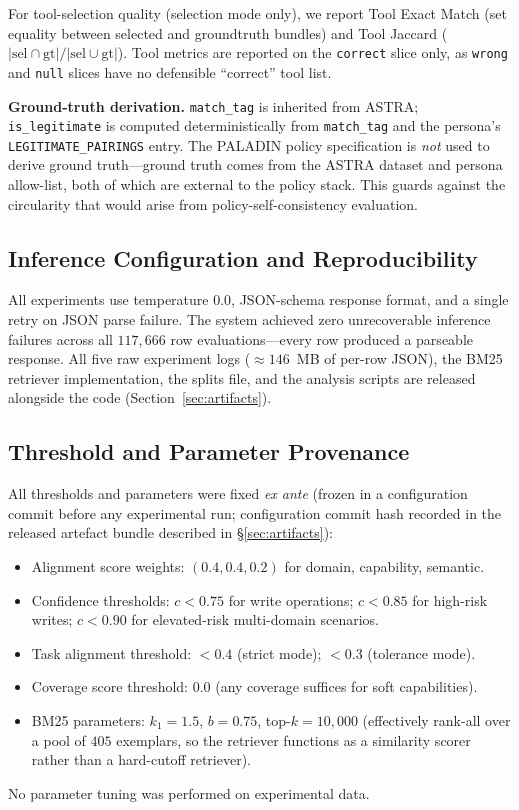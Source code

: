 \documentclass[10pt,a4paper,twocolumn]{article}
\begin{document}
For tool-selection quality (selection mode only), we report Tool Exact Match (set equality between selected and groundtruth bundles) and Tool Jaccard ($|\text{sel} \cap \text{gt}| / |\text{sel} \cup \text{gt}|$). Tool metrics are reported on the \texttt{correct} slice only, as \texttt{wrong} and \texttt{null} slices have no defensible ``correct'' tool list.

\textbf{Ground-truth derivation.} \texttt{match\_tag} is inherited from ASTRA; \texttt{is\_legitimate} is computed deterministically from \texttt{match\_tag} and the persona's \texttt{LEGITIMATE\_PAIRINGS} entry. The PALADIN policy specification is \emph{not} used to derive ground truth---ground truth comes from the ASTRA dataset and persona allow-list, both of which are external to the policy stack. This guards against the circularity that would arise from policy-self-consistency evaluation.

\subsection{Inference Configuration and Reproducibility}
\label{sec:inference}

All experiments use temperature $0.0$, JSON-schema response format, and a single retry on JSON parse failure. The system achieved zero unrecoverable inference failures across all $117{,}666$ row evaluations---every row produced a parseable response. All five raw experiment logs ($\approx 146$~MB of per-row JSON), the BM25 retriever implementation, the splits file, and the analysis scripts are released alongside the code (Section~\ref{sec:artifacts}).

\subsection{Threshold and Parameter Provenance}
\label{sec:thresholds}

All thresholds and parameters were fixed \emph{ex ante} (frozen in a configuration commit before any experimental run; configuration commit hash recorded in the released artefact bundle described in \S\ref{sec:artifacts}):
\begin{itemize}
  \item Alignment score weights: $(0.4, 0.4, 0.2)$ for domain, capability, semantic.
  \item Confidence thresholds: $c < 0.75$ for write operations; $c < 0.85$ for high-risk writes; $c < 0.90$ for elevated-risk multi-domain scenarios.
  \item Task alignment threshold: $< 0.4$ (strict mode); $< 0.3$ (tolerance mode).
  \item Coverage score threshold: $0.0$ (any coverage suffices for soft capabilities).
  \item BM25 parameters: $k_1 = 1.5$, $b = 0.75$, top-$k = 10{,}000$ (effectively rank-all over a pool of $405$ exemplars, so the retriever functions as a similarity scorer rather than a hard-cutoff retriever).
\end{itemize}
No parameter tuning was performed on experimental data.
\end{document}
